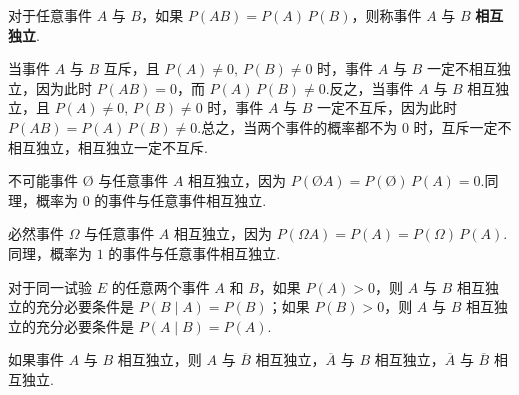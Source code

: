 \begin{definition}
    \indent 对于任意事件 $A$ 与 $B$，如果 $P(AB) = P(A) \, P(B)$，则称事件 $A$ 与 $B$ \textbf{相互独立}.
\end{definition}

\begin{note}
    \indent 当事件 $A$ 与 $B$ 互斥，且 $P(A) \not= 0, \, P(B) \not= 0$ 时，事件 $A$ 与 $B$ 一定不相互独立，因为此时 $P(AB) = 0$，而 $P(A) \, P(B) \not= 0$.反之，当事件 $A$ 与 $B$ 相互独立，且 $P(A) \not= 0, \, P(B) \not= 0$ 时，事件 $A$ 与 $B$ 一定不互斥，因为此时 $P(AB) = P(A) \, P(B) \not= 0$.总之，当两个事件的概率都不为 $0$ 时，互斥一定不相互独立，相互独立一定不互斥.

    不可能事件 $\text{\O}$ 与任意事件 $A$ 相互独立，因为 $P(\text{\O} A) = P(\text{\O}) \, P(A) = 0$.同理，概率为 $0$ 的事件与任意事件相互独立.

    必然事件 $\varOmega$ 与任意事件 $A$ 相互独立，因为 $P(\varOmega A) = P(A) = P(\varOmega) \, P(A)$.同理，概率为 $1$ 的事件与任意事件相互独立.
\end{note}

\begin{conclusion}
    \indent 对于同一试验 $E$ 的任意两个事件 $A$ 和 $B$，如果 $P(A) > 0$，则 $A$ 与 $B$ 相互独立的充分必要条件是 $P(B \mid A) = P(B)$；如果 $P(B) > 0$，则 $A$ 与 $B$ 相互独立的充分必要条件是 $P(A \mid B) = P(A)$.
\end{conclusion}

\begin{conclusion}
    \indent 如果事件 $A$ 与 $B$ 相互独立，则 $A$ 与 $\overline{B}$ 相互独立，$\overline{A}$ 与 $B$ 相互独立，$\overline{A}$ 与 $\overline{B}$ 相互独立.
\end{conclusion}

